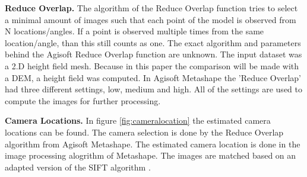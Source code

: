 \documentclass{isprs} %
\begin{document}
\textbf{Reduce Overlap.} 
The algorithm of the Reduce Overlap function tries to select a minimal amount of images such that each point of the model is observed from N locations/angles.
If a point is observed multiple times from the same location/angle, than this still counts as one. 
The exact algorithm and parameters behind the Agisoft Reduce Overlap function are unknown.
The input dataset was a 2.D height field mesh. 
Because in this paper the comparison will be made with a DEM, a height field was computed.
In Agisoft Metashape the 'Reduce Overlap' had three different settings, low, medium and high. 
All of the settings are used to compute the images for further processing.

\textbf{Camera Locations.}
In figure \ref{fig:cameralocation} the estimated camera locations can be found. The camera selection is done by the Reduce Overlap algorithm from Agisoft Metashape. The estimated camera location is done in the image processing alogrithm of Metashape.
The images are matched based on an adapted version of the SIFT algorithm \citep{lowe1999object, AgisoftMetashape}. 
\end{document}
